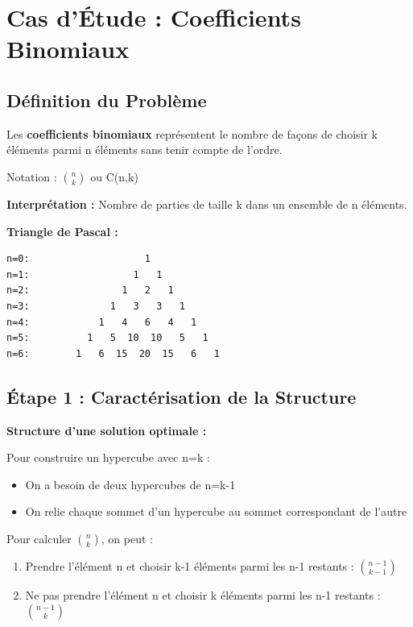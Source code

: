 \documentclass[12pt,a4paper]{article}
\begin{document}
\newpage
\section{Cas d'Étude : Coefficients Binomiaux}

\subsection{Définition du Problème}

\begin{definition}
Les \textbf{coefficients binomiaux} représentent le nombre de façons de choisir k éléments parmi n éléments sans tenir compte de l'ordre.

Notation : $\binom{n}{k}$ ou C(n,k)

\textbf{Interprétation :} Nombre de parties de taille k dans un ensemble de n éléments.
\end{definition}

\begin{exemple}
\textbf{Triangle de Pascal :}

\begin{verbatim}
n=0:                    1
n=1:                  1   1
n=2:                1   2   1
n=3:              1   3   3   1
n=4:            1   4   6   4   1
n=5:          1   5  10  10   5   1
n=6:        1   6  15  20  15   6   1
\end{verbatim}
\end{exemple}

\subsection{Étape 1 : Caractérisation de la Structure}

\begin{important}
\textbf{Structure d'une solution optimale :}

Pour construire un hypercube avec n=k :
\begin{itemize}
    \item On a besoin de deux hypercubes de n=k-1
    \item On relie chaque sommet d'un hypercube au sommet correspondant de l'autre
\end{itemize}

Pour calculer $\binom{n}{k}$, on peut :
\begin{enumerate}
    \item Prendre l'élément n et choisir k-1 éléments parmi les n-1 restants : $\binom{n-1}{k-1}$
    \item Ne pas prendre l'élément n et choisir k éléments parmi les n-1 restants : $\binom{n-1}{k}$
\end{enumerate}
\end{important}
\end{document}

